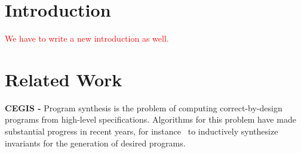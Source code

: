 \documentclass[twocolumn]{autart}    %
\begin{document}
\section{Introduction}
\textcolor{red}{We have to write a new introduction as well.} 






\section{Related Work}
\label{sec:relw}

\textbf{CEGIS -}
Program synthesis is the problem of computing correct-by-design programs
from high-level specifications. Algorithms for this problem have made
substantial progress in recent years, for instance~\cite{itzhaky2010simple} 
to inductively synthesize invariants for the generation of desired programs.
\end{document}
